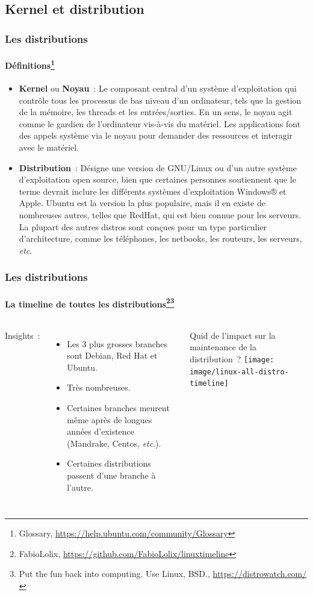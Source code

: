 \documentclass{beamer}
\begin{document}
    \subsection{Kernel et distribution}\label{subsec:kernel-et-distribution}

    \begin{frame}
        \transdissolve
        \frametitle{Les distributions}
        \framesubtitle{Définitions\footnote{Glossary, \url{https://help.ubuntu.com/community/Glossary}}}
        \begin{itemize}
            \item \textbf{Kernel} ou \textbf{Noyau}~: Le composant central d'un système d'exploitation qui contrôle tous les processus de bas niveau d'un ordinateur, tels que la gestion de la mémoire, les threads et les entrées/sorties.
            En un sens, le noyau agit comme le gardien de l'ordinateur vis-à-vis du matériel.
            Les applications font des appels système via le noyau pour demander des ressources et interagir avec le matériel.
            \item \textbf{Distribution}~: Désigne une version de GNU/Linux ou d'un autre système d'exploitation open source, bien que certaines personnes soutiennent que le terme devrait inclure les différents systèmes d'exploitation Windows® et Apple.
            Ubuntu est la version la plus populaire, mais il en existe de nombreuses autres, telles que RedHat, qui est bien connue pour les serveurs.
            La plupart des autres distros sont conçues pour un type particulier d'architecture, comme les téléphones, les netbooks, les routeurs, les serveurs, \textit{etc}.
        \end{itemize}
    \end{frame}

    \begin{frame}
        \transdissolve
        \frametitle{Les distributions}
        \framesubtitle{La timeline de toutes les distributions\footnote{FabioLolix, \url{https://github.com/FabioLolix/linuxtimeline}}\footnotestep\footnote{Put the fun back into computing. Use Linux, BSD., \url{https://distrowatch.com/}}}
        \begin{columns}
            Insights~:
            \begin{itemize}
                \item Les 3 plus grosses branches sont Debian, Red Hat et Ubuntu.
                \item Très nombreuses.
                \item Certaines branches meurent même après de longues années d'existence (Mandrake, Centos, \textit{etc}.).
                \item Certaines distributions passent d'une branche à l'autre.
            \end{itemize}
            Quid de l'impact sur la maintenance de la distribution~?
            \centering
            \texttt{[image: image/linux-all-distro-timeline]}
        \end{columns}
    \end{frame}
\end{document}
